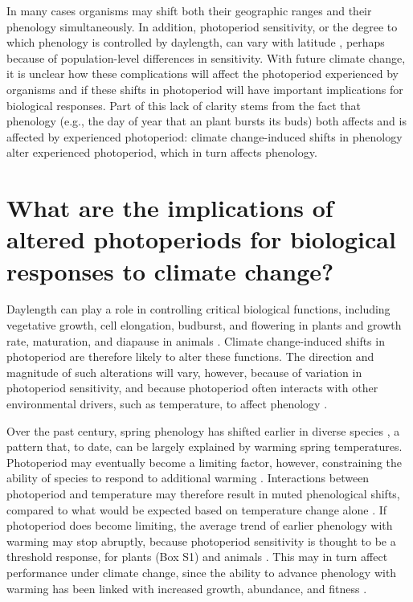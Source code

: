 \documentclass{article}
\begin{document}
\par In many cases organisms may shift both their geographic ranges and their phenology simultaneously. In addition, photoperiod sensitivity, or the degree to which phenology is controlled by daylength, can vary with latitude \citep{Howe:1996,saikkonen2012,Partanen:2005aa,Vihera-Aarnio:2006aa,Caffarra:2011b,gauzere2017}, perhaps because of population-level differences in sensitivity. With future climate change, it is unclear how these complications will affect the photoperiod experienced by organisms and if these shifts in photoperiod will have important implications for biological responses. Part of this lack of clarity stems from the fact that phenology (e.g., the day of year that an plant bursts its buds) both affects and is affected by experienced photoperiod: climate change-induced shifts in phenology alter experienced photoperiod, which in turn affects phenology.


\section*{What are the implications of altered photoperiods for biological responses to climate change?}
\par Daylength can play a role in controlling critical biological functions, including vegetative growth, cell elongation, budburst, and flowering in plants \citep{linkosalo2006,erwin1998,sidaway2010, hsu2011,Heide:2011aa,Ashby:1962aa,Heide:2012aa,mimura2007} and growth rate, maturation, and diapause in animals \citep{muir1994,bradshaw2006,saunders1970,tobin2008}. Climate change-induced shifts in photoperiod are therefore likely to alter these functions. The direction and magnitude of such alterations will vary, however, because of variation in photoperiod sensitivity, and because photoperiod often interacts with other environmental drivers, such as temperature, to affect phenology \citep [Box 1,][]{zydlewski2014}. 

\par Over the past century, spring phenology has shifted earlier in diverse species \citep{menzel2000,ovaskainen2013,penuelas2002,polgar2013}, a pattern that, to date, can be largely explained by warming spring temperatures. Photoperiod may eventually become a limiting factor, however, constraining the ability of species to respond to additional warming \citep{koerner2010b,vitasse2013, Morin:2010aa,Nienstaedt:1966aa}. Interactions between photoperiod and temperature may therefore result in muted phenological shifts, compared to what would be expected based on temperature change alone \citep{wareing1956,mimura2007,koerner2010b}. If photoperiod does become limiting, the average trend of earlier phenology with warming may stop abruptly, because photoperiod sensitivity is thought to be a threshold response, for plants (Box S1) and animals \citep{tobin2008,}. This may in turn affect performance under climate change, since the ability to advance phenology with warming has been linked with increased growth, abundance, and fitness \citep{muir1994,cleland2012,willis2010}.
\end{document}
